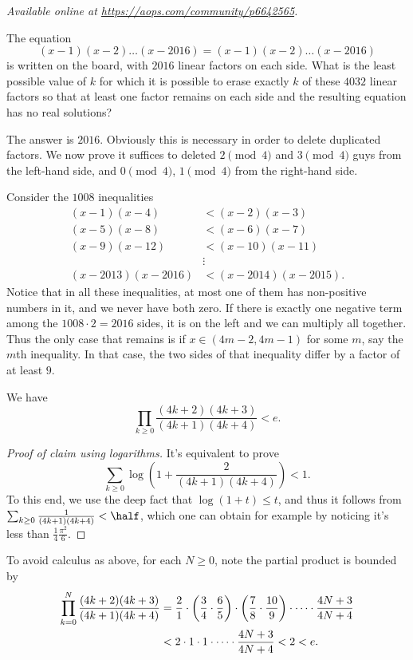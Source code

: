 \textsl{Available online at \url{https://aops.com/community/p6642565}.}
\begin{mdframed}[style=mdpurplebox,frametitle={Problem statement}]
The equation
\[ (x-1)(x-2)\dots(x-2016)=(x-1)(x-2)\dots (x-2016) \]
is written on the board, with $2016$ linear factors on each side.
What is the least possible value of $k$ for which it is possible to
erase exactly $k$ of these $4032$ linear factors so that at least
one factor remains on each side and the resulting equation
has no real solutions?
\end{mdframed}
The answer is $2016$.
Obviously this is necessary in order to delete duplicated factors.
We now prove it suffices to deleted $2 \pmod 4$ and $3 \pmod 4$
guys from the left-hand side, and $0 \pmod 4$,
$1 \pmod 4$ from the right-hand side.

Consider the $1008$ inequalities
\begin{align*}
  (x-1)(x-4) &< (x-2)(x-3) \\
  (x-5)(x-8) &< (x-6)(x-7) \\
  (x-9)(x-12) &< (x-10)(x-11) \\
  &\vdots \\
  (x-2013)(x-2016) &< (x-2014)(x-2015).
\end{align*}
Notice that in all these inequalities, at most one of them
has non-positive numbers in it, and we never have both zero.
If there is exactly one negative term among the $1008 \cdot 2 = 2016$ sides,
it is on the left and we can multiply all together.
Thus the only case that remains is if $x \in (4m-2, 4m-1)$ for some $m$,
say the $m$th inequality.
In that case, the two sides of that inequality differ by a factor of at least $9$.

\begin{claim*}
  We have \[ \prod_{k \ge 0} \frac{(4k+2)(4k+3)}{(4k+1)(4k+4)} < e. \]
\end{claim*}
\begin{proof}
  [Proof of claim using logarithms]
  It's equivalent to prove
  \[ \sum_{k \ge 0} \log \left( 1 + \frac{2}{(4k+1)(4k+4)} \right) < 1. \]
  To this end, we use the deep fact that $\log(1+t) \le t$,
  and thus it follows from
  $\sum_{k \ge 0} \frac{1}{(4k+1)(4k+4)} < \half$,
  which one can obtain for example by noticing
  it's less than $\frac14\frac{\pi^2}{6}$.
\end{proof}
\begin{remark*}
  To avoid calculus as above, for each $N \ge 0$, note the partial product is bounded by
  \begin{align*}
    \prod_{k=0}^N \frac{(4k+2)(4k+3)}{(4k+1)(4k+4)}
    &=
    \frac 21 \cdot \left( \frac 34 \cdot \frac 65 \right)
      \cdot \left( \frac 78 \cdot \frac{10}{9} \right) \cdot \dots
      \cdot \frac{4N+3}{4N+4} \\
    &< 2 \cdot 1 \cdot 1 \cdot \dots \cdot \frac{4N+3}{4N+4}
    < 2 < e. \qedhere
  \end{align*}
\end{remark*}

